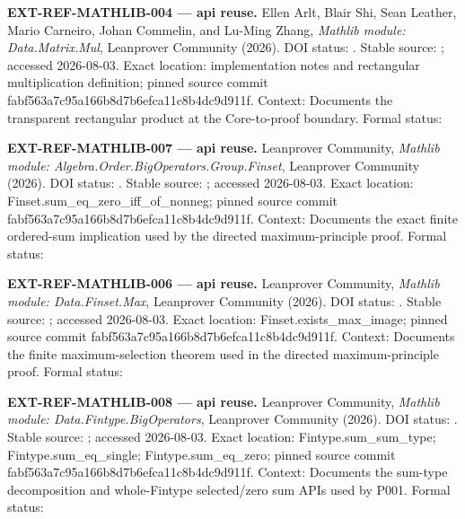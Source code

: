 \textbf{EXT-REF-MATHLIB-004 --- api reuse.} Ellen Arlt, Blair Shi, Sean
Leather, Mario Carneiro, Johan Commelin, and Lu-Ming Zhang,
\emph{Mathlib module: Data.Matrix.Mul}, Leanprover Community (2026). DOI
status: \texttt{\protect{}}. Stable source:
\texttt{\protect{}};
accessed 2026-08-03. Exact location: implementation notes and
rectangular multiplication definition; pinned source commit
fabf563a7c95a166b8d7b6efca11c8b4dc9d911f. Context: Documents the
transparent rectangular product at the Core-to-proof boundary. Formal
status: \texttt{\protect{}}

\textbf{EXT-REF-MATHLIB-007 --- api reuse.} Leanprover Community,
\emph{Mathlib module: Algebra.Order.BigOperators.Group.Finset},
Leanprover Community (2026). DOI status:
\texttt{\protect{}}. Stable source:
\texttt{\protect{}};
accessed 2026-08-03. Exact location:
Finset.sum\_eq\_zero\_iff\_of\_nonneg; pinned source commit
fabf563a7c95a166b8d7b6efca11c8b4dc9d911f. Context: Documents the exact
finite ordered-sum implication used by the directed maximum-principle
proof. Formal status:
\texttt{\protect{}}

\textbf{EXT-REF-MATHLIB-006 --- api reuse.} Leanprover Community,
\emph{Mathlib module: Data.Finset.Max}, Leanprover Community (2026). DOI
status: \texttt{\protect{}}. Stable source:
\texttt{\protect{}};
accessed 2026-08-03. Exact location: Finset.exists\_max\_image; pinned
source commit fabf563a7c95a166b8d7b6efca11c8b4dc9d911f. Context:
Documents the finite maximum-selection theorem used in the directed
maximum-principle proof. Formal status:
\texttt{\protect{}}

\textbf{EXT-REF-MATHLIB-008 --- api reuse.} Leanprover Community,
\emph{Mathlib module: Data.Fintype.BigOperators}, Leanprover Community
(2026). DOI status: \texttt{\protect{}}. Stable
source:
\texttt{\protect{}};
accessed 2026-08-03. Exact location: Fintype.sum\_sum\_type;
Fintype.sum\_eq\_single; Fintype.sum\_eq\_zero; pinned source commit
fabf563a7c95a166b8d7b6efca11c8b4dc9d911f. Context: Documents the
sum-type decomposition and whole-Fintype selected/zero sum APIs used by
P001. Formal status:
\texttt{\protect{}}

